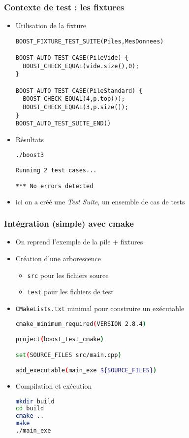 \begin{frame}[fragile]
\frametitle{Contexte de test : les fixtures}
\begin{itemize}
\item Utilisation de la fixture
\begin{lstlisting}
BOOST_FIXTURE_TEST_SUITE(Piles,MesDonnees)

BOOST_AUTO_TEST_CASE(PileVide) {
  BOOST_CHECK_EQUAL(vide.size(),0);
}

BOOST_AUTO_TEST_CASE(PileStandard) {
  BOOST_CHECK_EQUAL(4,p.top());
  BOOST_CHECK_EQUAL(3,p.size());
}
BOOST_AUTO_TEST_SUITE_END()
\end{lstlisting}
\item Résultats
\begin{lstlisting}[language=Bash]
./boost3

Running 2 test cases...

*** No errors detected
\end{lstlisting}
\item ici on a créé une \textit{Test Suite}, un ensemble de cas de tests
\end{itemize}
\end{frame}

\begin{frame}[fragile]
\frametitle{Intégration (simple) avec cmake}
\begin{itemize}
\item On reprend l'exemple de la pile + fixtures
\item Création d'une arborescence
	\begin{itemize}
	\item \texttt{src} pour les fichiers source
	\item \texttt{test} pour les fichiers de test
	\end{itemize}
\item \texttt{CMakeLists.txt} minimal pour construire un exécutable
\begin{lstlisting}[language=Bash]
cmake_minimum_required(VERSION 2.8.4)

project(boost_test_cmake)

set(SOURCE_FILES src/main.cpp)

add_executable(main_exe ${SOURCE_FILES})
\end{lstlisting}
\item Compilation et exécution
\begin{lstlisting}[language=Bash]
mkdir build
cd build
cmake ..
make
./main_exe
\end{lstlisting}

\end{itemize}
\end{frame}


